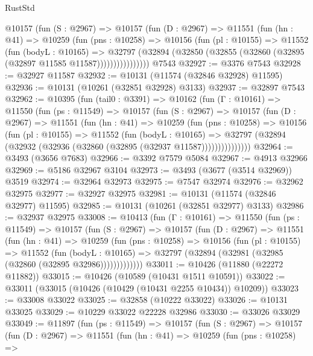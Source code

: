 \begin{lexlean}{RustStd}
\begin{coremodule}
          @10157
            (fun (S : @2967) =>
            @10157
              (fun (D : @2967) =>
              @11551
                (fun (hn : @41) =>
                @10259
                  (fun (pns : @10258) =>
                  @10156
                    (fun (pl : @10155) =>
                    @11552
                      (fun (bodyL : @10165) =>
                      @32797
                        (@32894
                          (@32850 (@32855 (@32860 (@32895 (@32897 @11585 @11587))))))))))))))))
    @7543
@32927 := @3376 @7543
@32928 := @32927 @11587
@32932 := @10131 (@11574 (@32846 @32928) @11595)
@32936 := @10131 (@10261 (@32851 @32928) @3133)
@32937 := @32897 @7543
@32962 := @10395
    (fun (tail0 : @3391) =>
    @10162
      (fun (Γ : @10161) =>
      @11550
        (fun (ps : @11549) =>
        @10157
          (fun (S : @2967) =>
          @10157
            (fun (D : @2967) =>
            @11551
              (fun (hn : @41) =>
              @10259
                (fun (pns : @10258) =>
                @10156
                  (fun (pl : @10155) =>
                  @11552
                    (fun (bodyL : @10165) =>
                    @32797 (@32894 (@32932 (@32936 (@32860 (@32895 (@32937 @11587)))))))))))))))
@32964 := @3493 (@3656 @7683)
@32966 := @3392 @7579 @5084
@32967 := @4913 @32966
@32969 := @5186 @32967 @3104
@32973 := @3493 (@3677 (@3514 @32969)) @3519
@32974 := @32964 @32973
@32975 := @7547 @32974
@32976 := @32962 @32975
@32977 := @32927 @32975
@32981 := @10131 (@11574 (@32846 @32977) @11595)
@32985 := @10131 (@10261 (@32851 @32977) @3133)
@32986 := @32937 @32975
@33008 := @10413
    (fun (Γ : @10161) =>
    @11550
      (fun (ps : @11549) =>
      @10157
        (fun (S : @2967) =>
        @10157
          (fun (D : @2967) =>
          @11551
            (fun (hn : @41) =>
            @10259
              (fun (pns : @10258) =>
              @10156
                (fun (pl : @10155) =>
                @11552
                  (fun (bodyL : @10165) =>
                  @32797 (@32894 (@32981 (@32985 (@32860 (@32895 @32986)))))))))))))
@33011 := @10426 (@11880 (@22272 @11882))
@33015 := @10426 (@10589 (@10431 @1511 @10591))
@33022 := @33011 (@33015 (@10426 (@10429 (@10431 @2255 @10434)) @10209))
@33023 := @33008 @33022
@33025 := @32858 (@10222 @33022)
@33026 := @10131 @33025
@33029 := @10229 @33022 @22228 @32986
@33030 := @33026 @33029
@33049 := @11897
    (fun (ps : @11549) =>
    @10157
      (fun (S : @2967) =>
      @10157
        (fun (D : @2967) =>
        @11551
          (fun (hn : @41) =>
          @10259
            (fun (pns : @10258) =>

\end{coremodule}
\end{lexlean}
